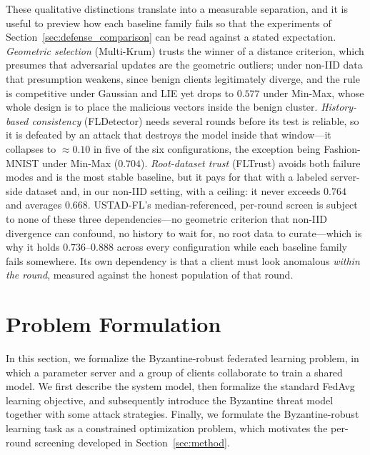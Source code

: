 \documentclass[journal]{IEEEtran}
\begin{document}
These qualitative distinctions translate into a measurable separation, and it is useful to preview how each baseline family fails so that the experiments of Section~\ref{sec:defense_comparison} can be read against a stated expectation. \emph{Geometric selection} (Multi-Krum) trusts the winner of a distance criterion, which presumes that adversarial updates are the geometric outliers; under non-IID data that presumption weakens, since benign clients legitimately diverge, and the rule is competitive under Gaussian and LIE yet drops to $0.577$ under Min-Max, whose whole design is to place the malicious vectors inside the benign cluster. \emph{History-based consistency} (FLDetector) needs several rounds before its test is reliable, so it is defeated by an attack that destroys the model inside that window---it collapses to $\approx0.10$ in five of the six configurations, the exception being Fashion-MNIST under Min-Max ($0.704$). \emph{Root-dataset trust} (FLTrust) avoids both failure modes and is the most stable baseline, but it pays for that with a labeled server-side dataset and, in our non-IID setting, with a ceiling: it never exceeds $0.764$ and averages $0.668$. USTAD-FL's median-referenced, per-round screen is subject to none of these three dependencies---no geometric criterion that non-IID divergence can confound, no history to wait for, no root data to curate---which is why it holds $0.736$--$0.888$ across every configuration while each baseline family fails somewhere. Its own dependency is that a client must look anomalous \emph{within the round}, measured against the honest population of that round.

\section{Problem Formulation}
\label{sec:formulation}

In this section, we formalize the Byzantine-robust federated learning problem, in which a parameter server and a group of clients collaborate to train a shared model. We first describe the system model, then formalize the standard FedAvg learning objective, and subsequently introduce the Byzantine threat model together with some attack strategies. Finally, we formulate the Byzantine-robust learning task as a constrained optimization problem, which motivates the per-round screening developed in Section~\ref{sec:method}.
\end{document}
